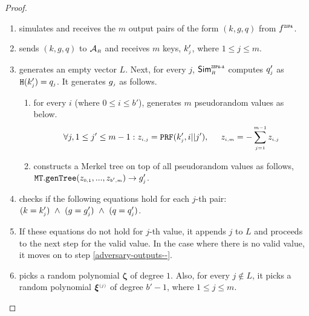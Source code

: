 \begin{proof}
\begin{enumerate}
%
\item simulates  \zspa and receives the $m$ output pairs of the form $( k,  g,  q) $ from $f^{\scriptscriptstyle \mathtt{ZSPA}}$.
%
\item sends $( k,  g,  q) $ to $\mathcal{A}_{\scriptscriptstyle R}$ and receives $m$ keys, $ k'_{\scriptscriptstyle j}$, where $1\leq j \leq m$. 
%
\item\label{ZSPA-A-Case-2-generate-z} generates an empty vector $ L$. Next, for every $j$, $\mathsf{Sim}^{\scriptscriptstyle \mathtt{ZSPA\text{-}A}}_{\scriptscriptstyle R}$ computes $q'_{\scriptscriptstyle j}$ as $\mathtt {H}( k'_{\scriptscriptstyle j})=q_{\scriptscriptstyle j}$.  It generates $g_{\scriptscriptstyle j}$ as follows. 


\begin{enumerate}

\item\label{gen-pr-vals} for every $i$ (where $0\leq i \leq b'$), generates $m$ pseudorandom values as below. 
%
 $$\forall j, 1\leq j' \leq m-1: z_{\scriptscriptstyle i,j}=\mathtt{PRF}( k'_{\scriptscriptstyle j},i||j'), \hspace{5mm} z_{\scriptscriptstyle i,m}=-\sum\limits^{\scriptscriptstyle m-1}_{\scriptscriptstyle j=1}z_{\scriptscriptstyle i,j}$$
%
\item  constructs a Merkel tree on top of all pseudorandom values as follows,  $\mathtt{MT.genTree}(z_{\scriptscriptstyle 0,1},...,z_{\scriptscriptstyle b', m})\rightarrow  g'_{\scriptscriptstyle j}$. 
%
\end{enumerate}
%
\item checks if the following equations hold for each $j$-th pair: 
%
$( k=    k'_{\scriptscriptstyle j}) \ \wedge\  ( g=   g'_{\scriptscriptstyle j})  \ \wedge\ ( q=  q'_{\scriptscriptstyle j})$.
%
%
\item If these equations do not hold for $j$-th value, it appends $j$ to $ L$ and proceeds to the next step for the valid value. In the case where there is no valid value, it moves on to step \ref{adversary-outputs--}. 


\item picks a random polynomial ${\bm \zeta}$ of degree $1$. Also, for every $j\notin  L$, it picks a random polynomial ${\bm\xi}^{\scriptscriptstyle (j)}$ of degree $b'-1$, where $1\leq j \leq m$. 
%


\end{enumerate}
\end{proof}
